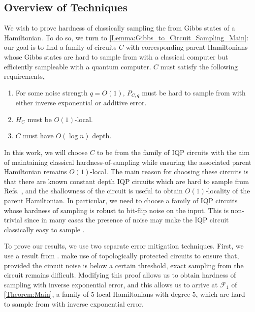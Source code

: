 \documentclass[a4paper,onecolumn,11pt,accepted=2017-05-09]{quantumarticle}
\begin{document}
	\subsection{Overview of Techniques} 
 We wish to prove hardness of classically sampling the from Gibbs states of a Hamiltonian.
 To do so, we turn to \cref{Lemma:Gibbs_to_Circuit_Sampling_Main}:
 our goal is to find a family of circuits $C$ with corresponding parent Hamiltonians whose Gibbs states are hard to sample from with a classical computer but efficiently sampleable with a quantum computer. $C$ must satisfy the following requirements, 
 \begin{enumerate}
     \item For some noise strength $q = O(1)$, $P_{C,q}$ must be hard to sample from with either inverse exponential or additive error.
     \item $H_C$ must be $O(1)$-local.
     \item $C$ must have $O(\log n)$ depth.
 \end{enumerate}
 In this work, we will choose $C$ to be from the family of IQP circuits with the aim of maintaining classical hardness-of-sampling while ensuring the associated parent Hamiltonian remains $O(1)$-local.
 The main reason for choosing these circuits is that there are known constant depth IQP circuits which are hard to sample from Refs. \cite{fujii2016computational, Hangleiter_2018}, and the shallowness of the circuit is useful to obtain $O(1)$-locality of the parent Hamiltonian. 
 In particular, we need to choose a family of IQP circuits whose hardness of sampling is robust to bit-flip noise on the input.
 This is non-trivial since in many cases the presence of noise may make the IQP circuit classically easy to sample \cite{bremner2016average, rajakumar2024polynomial}.
 
    To prove our results, we use two separate error mitigation techniques. 
    First, we use a result from \citeauthor{fujii2016computational} \cite{fujii2016computational}.
    \citeauthor{fujii2016computational} make use of topologically protected circuits to ensure that, provided the circuit noise is below a certain threshold, exact sampling from the circuit remains difficult. 
    Modifying this proof allows us to obtain hardness of sampling with inverse exponential error, and 
    this allows us to arrive at $\mathcal{F}_1$ of \cref{Theorem:Main}, a family of $5$-local Hamiltonians with degree $5$, which are hard to sample from with inverse exponential error. 
    
\end{document}
